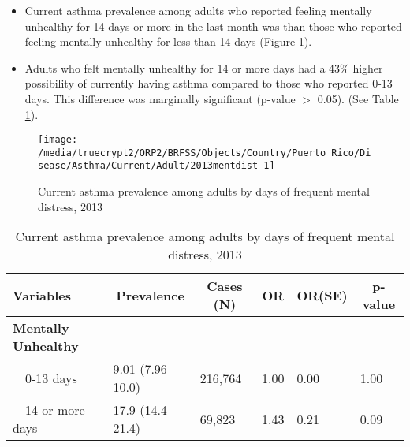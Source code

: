  \newpage
\begin{itemize}

\item Current asthma prevalence among adults who reported feeling mentally unhealthy for 14 days or more in the last month was  than those who reported feeling mentally unhealthy for less than 14 days (Figure \ref{fig:mental.Asthma.2013}).


\item  Adults who felt mentally unhealthy for 14 or more days had a 43\% higher possibility of currently having asthma compared to those who reported 0-13 days. This difference was marginally significant (p-value $>$ 0.05). (See Table \ref{tab:mental.Asthma.2013}).

\end{itemize}

\begin{figure}[H]
\centering
\caption{Current asthma prevalence among adults by days of frequent mental distress, 2013}
\label{fig:mental.Asthma.2013}

\begin{knitrout}
\color{fgcolor}

{\centering \texttt{[image: /media/truecrypt2/ORP2/BRFSS/Objects/Country/Puerto\_Rico/Disease/Asthma/Current/Adult/2013mentdist-1]} 

}



\end{knitrout}
 \end{figure}

\begin{table}[H]
\caption{Current asthma prevalence among adults by days of frequent mental distress, 2013\label{tab:mental.Asthma.2013}} 
\begin{center}
\begin{tabular}{llllll}
\hline\hline
\multicolumn{1}{l}{Variables}&\multicolumn{1}{c}{Prevalence}&\multicolumn{1}{c}{Cases (N)}&\multicolumn{1}{c}{OR}&\multicolumn{1}{c}{OR(SE)}&\multicolumn{1}{c}{p-value}\tabularnewline
\hline
{\bfseries Mentally Unhealthy}&&&&&\tabularnewline
~~0-13 days&9.01 (7.96-10.0)&216,764&1.00&0.00&1.00\tabularnewline
~~14 or more days&17.9 (14.4-21.4)& 69,823&1.43&0.21&0.09\tabularnewline
\hline
\end{tabular}\end{center}

\end{table}



